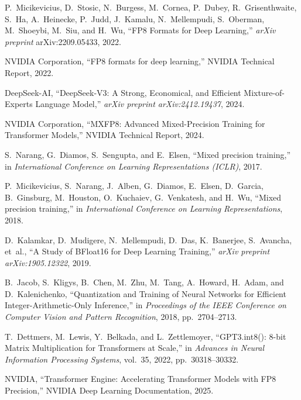 \documentclass[conference]{IEEEtran}
\begin{document}
\begin{thebibliography}{40}

P.~Micikevicius, D.~Stosic, N.~Burgess, M.~Cornea, P.~Dubey, R.~Grisenthwaite, 
S.~Ha, A.~Heinecke, P.~Judd, J.~Kamalu, N.~Mellempudi, S.~Oberman, 
M.~Shoeybi, M.~Siu, and H.~Wu, 
``FP8 Formats for Deep Learning,'' 
\emph{arXiv preprint} arXiv:2209.05433, 2022.

NVIDIA Corporation,
``FP8 formats for deep learning,''
NVIDIA Technical Report, 2022.

DeepSeek-AI,
``DeepSeek-V3: A Strong, Economical, and Efficient Mixture-of-Experts Language Model,''
\emph{arXiv preprint arXiv:2412.19437}, 2024.

NVIDIA Corporation,
``MXFP8: Advanced Mixed-Precision Training for Transformer Models,''
NVIDIA Technical Report, 2024.

S.~Narang, G.~Diamos, S.~Sengupta, and E.~Elsen,
``Mixed precision training,''
in \emph{International Conference on Learning Representations (ICLR)}, 2017.

P.~Micikevicius, S.~Narang, J.~Alben, G.~Diamos, E.~Elsen, D.~Garcia, B.~Ginsburg, M.~Houston, O.~Kuchaiev, G.~Venkatesh, and H.~Wu,
``Mixed precision training,''
in \emph{International Conference on Learning Representations}, 2018.

D.~Kalamkar, D.~Mudigere, N.~Mellempudi, D.~Das, K.~Banerjee, S.~Avancha, et~al.,
``A Study of BFloat16 for Deep Learning Training,''
\emph{arXiv preprint arXiv:1905.12322}, 2019.

B.~Jacob, S.~Kligys, B.~Chen, M.~Zhu, M.~Tang, A.~Howard, H.~Adam, and D.~Kalenichenko,
``Quantization and Training of Neural Networks for Efficient Integer-Arithmetic-Only Inference,''
in \emph{Proceedings of the IEEE Conference on Computer Vision and Pattern Recognition}, 2018, pp.~2704--2713.

T.~Dettmers, M.~Lewis, Y.~Belkada, and L.~Zettlemoyer,
``GPT3.int8(): 8-bit Matrix Multiplication for Transformers at Scale,''
in \emph{Advances in Neural Information Processing Systems}, vol.~35, 2022, pp.~30318--30332.

NVIDIA,
``Transformer Engine: Accelerating Transformer Models with FP8 Precision,''
NVIDIA Deep Learning Documentation, 2025.


\end{thebibliography}
\end{document}
